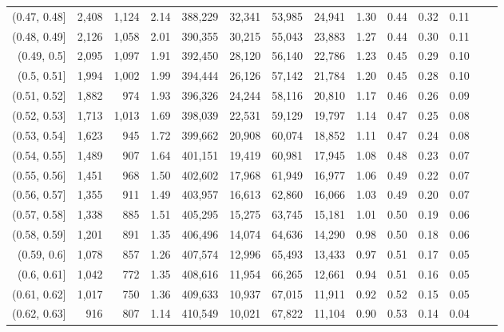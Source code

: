 \begin{tabular}{rrrrrrrrrrrrrr}
(0.47, 0.48]   &   2,408 &  1,124 &    2.14 &  388,229 &   32,341 &  53,985 &  24,941 &  1.30 &  0.44 &  0.32 &      0.11 \\
(0.48, 0.49]   &   2,126 &  1,058 &    2.01 &  390,355 &   30,215 &  55,043 &  23,883 &  1.27 &  0.44 &  0.30 &      0.11 \\
(0.49, 0.5]    &   2,095 &  1,097 &    1.91 &  392,450 &   28,120 &  56,140 &  22,786 &  1.23 &  0.45 &  0.29 &      0.10 \\
(0.5, 0.51]    &   1,994 &  1,002 &    1.99 &  394,444 &   26,126 &  57,142 &  21,784 &  1.20 &  0.45 &  0.28 &      0.10 \\
(0.51, 0.52]   &   1,882 &    974 &    1.93 &  396,326 &   24,244 &  58,116 &  20,810 &  1.17 &  0.46 &  0.26 &      0.09 \\
(0.52, 0.53]   &   1,713 &  1,013 &    1.69 &  398,039 &   22,531 &  59,129 &  19,797 &  1.14 &  0.47 &  0.25 &      0.08 \\
(0.53, 0.54]   &   1,623 &    945 &    1.72 &  399,662 &   20,908 &  60,074 &  18,852 &  1.11 &  0.47 &  0.24 &      0.08 \\
(0.54, 0.55]   &   1,489 &    907 &    1.64 &  401,151 &   19,419 &  60,981 &  17,945 &  1.08 &  0.48 &  0.23 &      0.07 \\
(0.55, 0.56]   &   1,451 &    968 &    1.50 &  402,602 &   17,968 &  61,949 &  16,977 &  1.06 &  0.49 &  0.22 &      0.07 \\
(0.56, 0.57]   &   1,355 &    911 &    1.49 &  403,957 &   16,613 &  62,860 &  16,066 &  1.03 &  0.49 &  0.20 &      0.07 \\
(0.57, 0.58]   &   1,338 &    885 &    1.51 &  405,295 &   15,275 &  63,745 &  15,181 &  1.01 &  0.50 &  0.19 &      0.06 \\
(0.58, 0.59]   &   1,201 &    891 &    1.35 &  406,496 &   14,074 &  64,636 &  14,290 &  0.98 &  0.50 &  0.18 &      0.06 \\
(0.59, 0.6]    &   1,078 &    857 &    1.26 &  407,574 &   12,996 &  65,493 &  13,433 &  0.97 &  0.51 &  0.17 &      0.05 \\
(0.6, 0.61]    &   1,042 &    772 &    1.35 &  408,616 &   11,954 &  66,265 &  12,661 &  0.94 &  0.51 &  0.16 &      0.05 \\
(0.61, 0.62]   &   1,017 &    750 &    1.36 &  409,633 &   10,937 &  67,015 &  11,911 &  0.92 &  0.52 &  0.15 &      0.05 \\
(0.62, 0.63]   &     916 &    807 &    1.14 &  410,549 &   10,021 &  67,822 &  11,104 &  0.90 &  0.53 &  0.14 &      0.04 \\

\end{tabular}
